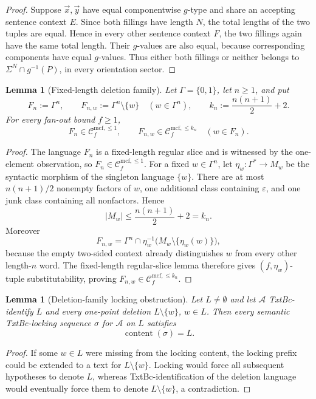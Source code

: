 \documentclass[11pt,a4paper]{article}
\numberwithin{equation}{section}
\theoremstyle{plain}
\newtheorem{lemma}[theorem]{Lemma}
\theoremstyle{definition}
\theoremstyle{remark}
\newcommand{\Clatent}[2]{\mathcal{C}^{\mathrm{mcf},\le #2}_{#1}}
\newcommand{\tuple}[1]{\vec{#1}}
\newcommand{\eps}{\varepsilon}
\begin{document}
\begin{proof}
Suppose \(\tuple x,\tuple y\) have equal componentwise \(g\)-type and share
an accepting sentence context \(E\).  Since both fillings have length \(N\),
the total lengths of the two tuples are equal.  Hence in every other sentence
context \(F\), the two fillings again have the same total length.  Their
\(g\)-values are also equal, because corresponding components have equal
\(g\)-values.  Thus either both fillings or neither belongs to
\(\Sigma^N\cap g^{-1}(P)\), in every orientation sector.
\end{proof}


\begin{lemma}[Fixed-length deletion family]
\label{lem:fixed-length-deletion-family}
Let \(\Gamma=\{0,1\}\), let \(n\ge1\), and put
\[
  F_n:=\Gamma^n,\qquad
  F_{n,w}:=\Gamma^n\setminus\{w\}\quad(w\in\Gamma^n),
  \qquad
  k_n:=\frac{n(n+1)}2+2.
\]
For every fan-out bound \(f\ge1\),
\[
  F_n\in\Clatent{f}{1},
  \qquad
  F_{n,w}\in\Clatent{f}{k_n}
  \quad(w\in F_n).
\]
\end{lemma}

\begin{proof}
The language \(F_n\) is a fixed-length regular slice and is witnessed by the
one-element observation, so $F_n\in\Clatent{f}{1}$.  For a fixed
\(w\in\Gamma^n\), let
\(\eta_w:\Gamma^*\to M_w\) be the syntactic morphism of the singleton
language \(\{w\}\).  There are at most \(n(n+1)/2\) nonempty factors of
\(w\), one additional class containing \(\eps\), and one junk class containing
all nonfactors.  Hence
\[
  |M_w|\le \frac{n(n+1)}2+2=k_n.
\]
Moreover
\[
  F_{n,w}=\Gamma^n\cap
  \eta_w^{-1}\bigl(M_w\setminus\{\eta_w(w)\}\bigr),
\]
because the empty two-sided context already distinguishes \(w\) from every
other length-\(n\) word.  The fixed-length regular-slice lemma therefore gives
\((f,\eta_w)\)-tuple substitutability, proving
\(F_{n,w}\in\Clatent{f}{k_n}\).
\end{proof}

\begin{lemma}[Deletion-family locking obstruction]
\label{lem:deletion-locking-obstruction}
Let \(L\ne\emptyset\) and let \(\mathcal A\) TxtBc-identify \(L\) and every
one-point deletion \(L\setminus\{w\}\), \(w\in L\).  Then every semantic
TxtBc-locking sequence \(\sigma\) for \(\mathcal A\) on \(L\) satisfies
\[
  \operatorname{content}(\sigma)=L.
\]
\end{lemma}

\begin{proof}
If some \(w\in L\) were missing from the locking content, the locking prefix
could be extended to a text for \(L\setminus\{w\}\).  Locking would force all
subsequent hypotheses to denote \(L\), whereas TxtBc-identification of the
deletion language would eventually force them to denote
\(L\setminus\{w\}\), a contradiction.
\end{proof}
\end{document}
